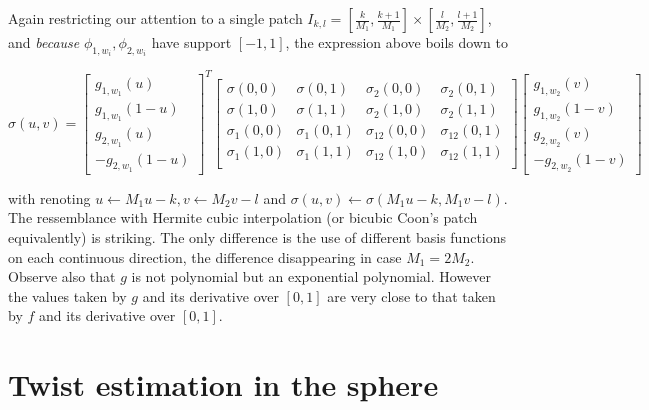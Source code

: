 \documentclass[a4paper, 11pt]{article}
\begin{document}
Again restricting our attention to a single patch $I_{k,l} = [\frac{k}{M_1}, \frac{k+1}{M_1}]\times[\frac{l}{M_2}, 
\frac{l+1}{M_2}]$, and \emph{because} $\phi_{1,w_i}, \phi_{2, w_i}$ have support $[-1,1]$, the expression above boils 
down to

\begin{equation}
  \boxed{\sigma(u, v) = \begin{bmatrix} g_{1, w_1}(u) \\ g_{1, w_1}(1-u) \\ g_{2, w_1}(u) \\ - g_{2, w_1}(1-u) 
    \end{bmatrix}^T
  \begin{bmatrix}
    \sigma(0,0) & \sigma(0,1) & \sigma_2(0,0) & \sigma_2(0,1) \\
    \sigma(1,0) & \sigma(1,1) & \sigma_2(1,0) & \sigma_2(1,1) \\
    \sigma_1(0,0) & \sigma_1(0,1) & \sigma_{12}(0,0) & \sigma_{12}(0,1) \\
    \sigma_1(1,0) & \sigma_1(1,1) & \sigma_{12}(1,0) & \sigma_{12}(1,1) \\
  \end{bmatrix}
  \begin{bmatrix} g_{1, w_2}(v) \\ g_{1, w_2}(1-v) \\ g_{2, w_2}(v) \\ - g_{2, w_2}(1-v) \end{bmatrix}}
\end{equation}

with renoting $u \leftarrow M_1u-k, v \leftarrow M_2v-l$ and $\sigma(u,v) \leftarrow \sigma(M_1u-k, M_1v-l)$. \\

The ressemblance with Hermite cubic interpolation (or bicubic Coon's patch equivalently) is striking. The only 
difference is the use of different basis functions on each continuous direction, the difference disappearing in case 
$M_1 = 2M_2$. Observe also that $g$ is not polynomial but an exponential polynomial. However the values taken by $g$ and 
its derivative over $[0,1]$ are very close to that taken by $f$ and its derivative over $[0,1]$.

\clearpage

\section{Twist estimation in the sphere}
\end{document}
